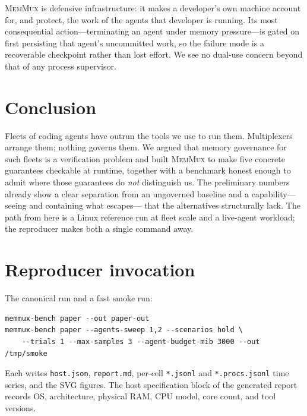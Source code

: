 \documentclass[11pt]{article}
\newcommand{\sys}{\textsc{MemMux}}
\newcommand{\code}[1]{\texttt{#1}}
\begin{document}
\sys{} is defensive infrastructure: it makes a developer's own machine account for, and protect, the
work of the agents that developer is running. Its most consequential action---terminating an agent
under memory pressure---is gated on first persisting that agent's uncommitted work, so the failure
mode is a recoverable checkpoint rather than lost effort. We see no dual-use concern beyond that of
any process supervisor.

\section{Conclusion}

Fleets of coding agents have outrun the tools we use to run them. Multiplexers arrange them; nothing
governs them. We argued that memory governance for such fleets is a verification problem and built
\sys{} to make five concrete guarantees checkable at runtime, together with a benchmark honest enough
to admit where those guarantees do \emph{not} distinguish us. The preliminary numbers already show a
clear separation from an ungoverned baseline and a capability---seeing and containing what escapes---
that the alternatives structurally lack. The path from here is a Linux reference run at fleet scale
and a live-agent workload; the reproducer makes both a single command away.

\small



\normalsize
\appendix
\section{Reproducer invocation}
The canonical run and a fast smoke run:
\begin{verbatim}
memmux-bench paper --out paper-out
memmux-bench paper --agents-sweep 1,2 --scenarios hold \
    --trials 1 --max-samples 3 --agent-budget-mib 3000 --out /tmp/smoke
\end{verbatim}
Each writes \code{host.json}, \code{report.md}, per-cell \code{*.jsonl} and \code{*.procs.jsonl}
time series, and the SVG figures. The host specification block of the generated report records OS,
architecture, physical RAM, CPU model, core count, and tool versions.
\end{document}
